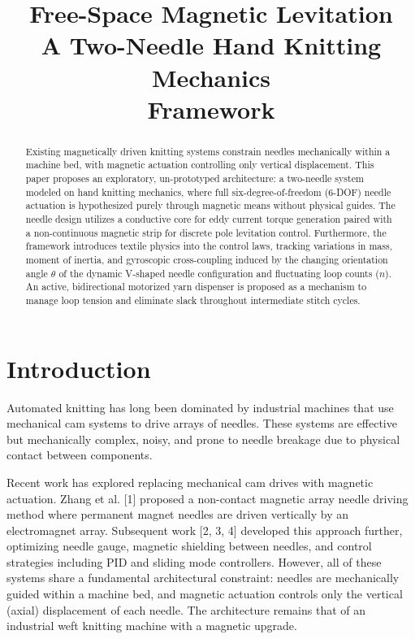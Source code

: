 \documentclass[10pt]{article}
\title{Free-Space Magnetic Levitation\\A Two-Needle Hand Knitting Mechanics\\Framework}
\author{}
\date{}
\begin{document}
\maketitle

\begin{abstract}
Existing magnetically driven knitting systems constrain needles mechanically within a machine bed, with magnetic actuation controlling only vertical displacement. This paper proposes an exploratory, un-prototyped architecture: a two-needle system modeled on hand knitting mechanics, where full six-degree-of-freedom (6-DOF) needle actuation is hypothesized purely through magnetic means without physical guides. The needle design utilizes a conductive core for eddy current torque generation paired with a non-continuous magnetic strip for discrete pole levitation control. Furthermore, the framework introduces textile physics into the control laws, tracking variations in mass, moment of inertia, and gyroscopic cross-coupling induced by the changing orientation angle $\theta$ of the dynamic V-shaped needle configuration and fluctuating loop counts ($n$). An active, bidirectional motorized yarn dispenser is proposed as a mechanism to manage loop tension and eliminate slack throughout intermediate stitch cycles.
\end{abstract}

\section{Introduction}
Automated knitting has long been dominated by industrial machines that use mechanical cam systems to drive arrays of needles. These systems are effective but mechanically complex, noisy, and prone to needle breakage due to physical contact between components.

Recent work has explored replacing mechanical cam drives with magnetic actuation. Zhang et al. [1] proposed a non-contact magnetic array needle driving method where permanent magnet needles are driven vertically by an electromagnet array. Subsequent work [2, 3, 4] developed this approach further, optimizing needle gauge, magnetic shielding between needles, and control strategies including PID and sliding mode controllers. However, all of these systems share a fundamental architectural constraint: needles are mechanically guided within a machine bed, and magnetic actuation controls only the vertical (axial) displacement of each needle. The architecture remains that of an industrial weft knitting machine with a magnetic upgrade.
\end{document}
